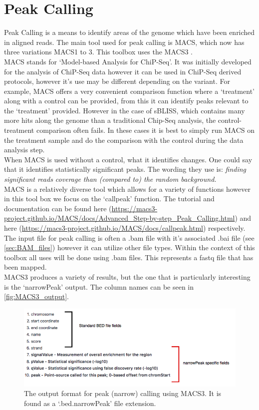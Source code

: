 \section{Peak Calling \label{sec:peak_call}}
Peak Calling is a means to identify areas of the genome which have been enriched in aligned reads. The main tool used for peak calling is MACS, which now has three variations MACS1 to 3. This toolbox uses the MACS3 \cite{MACS3}.\\
MACS stands for `Model-based Analysis for ChiP-Seq'. It was initially developed for the analysis of ChiP-Seq data however it can be used in ChiP-Seq derived protocols, however it's use may be different depending on the variant. For example, MACS offers a very convenient comparison function where a `treatment' along with a control can be provided, from this it can identify peaks relevant to the `treatment' provided. However in the case of sBLISS, which contains many more hits along the genome than a traditional Chip-Seq analysis, the control-treatment comparison often fails. In these cases it is best to simply run MACS on the treatment sample and do the comparison with the control during the data analysis step.\\
When MACS is used without a control, what it identifies changes. One could say that it identifies statistically significant peaks. The wording they use is: \textit{finding significant reads coverage than (compared to) the random background.}\\
MACS is a relatively diverse tool which allows for a variety of functions however in this tool box we focus on the `callpeak' function. The tutorial and documentation can be found here (\url{https://macs3-project.github.io/MACS/docs/Advanced_Step-by-step_Peak_Calling.html}) and here (\url{https://macs3-project.github.io/MACS/docs/callpeak.html}) respectively.\\
The input file for peak calling is often a .bam file with it's associated .bai file (see \autoref{sec:BAM_files}) however it can utilize other file types. Within the context of this toolbox all uses will be done using .bam files. This represents a fastq file that has been mapped.\\
MACS3 produces a variety of results, but the one that is particularly interesting is the `narrowPeak' output. The column names can be seen in \autoref{fig:MACS3_output}. 
\begin{figure}
\includegraphics[width=\textwidth]{figures/MACS3_peakcall_output.png}
\caption{The output format for peak (narrow) calling using MACS3. It is found as a `.bed.narrowPeak' file extension.}
\label{fig:MACS3_output}
\end{figure}
